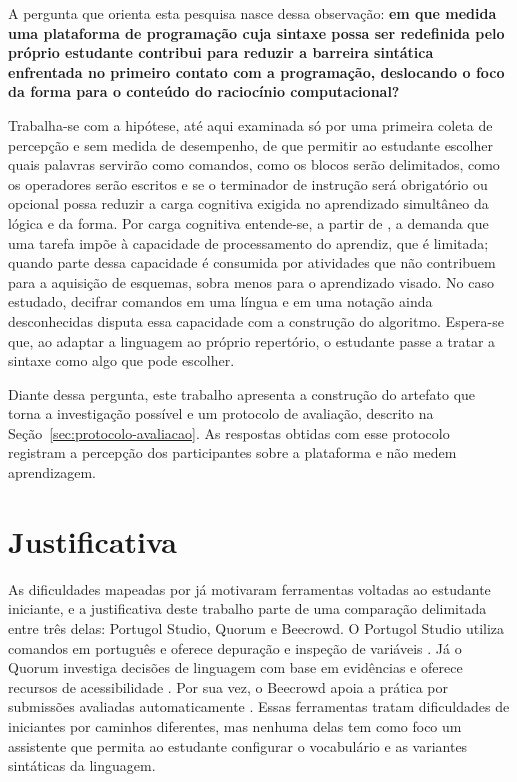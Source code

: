 A pergunta que orienta esta pesquisa nasce dessa observação: \textbf{em que medida uma plataforma de programação cuja sintaxe possa ser redefinida pelo próprio estudante contribui para reduzir a barreira sintática enfrentada no primeiro contato com a programação, deslocando o foco da forma para o conteúdo do raciocínio computacional?}

Trabalha-se com a hipótese, até aqui examinada só por uma primeira coleta de percepção e sem medida de desempenho, de que permitir ao estudante escolher quais palavras servirão como comandos, como os blocos serão delimitados, como os operadores serão escritos e se o terminador de instrução será obrigatório ou opcional possa reduzir a carga cognitiva exigida no aprendizado simultâneo da lógica e da forma. Por carga cognitiva entende-se, a partir de , a demanda que uma tarefa impõe à capacidade de processamento do aprendiz, que é limitada; quando parte dessa capacidade é consumida por atividades que não contribuem para a aquisição de esquemas, sobra menos para o aprendizado visado. No caso estudado, decifrar comandos em uma língua e em uma notação ainda desconhecidas disputa essa capacidade com a construção do algoritmo. Espera-se que, ao adaptar a linguagem ao próprio repertório, o estudante passe a tratar a sintaxe como algo que pode escolher.

Diante dessa pergunta, este trabalho apresenta a construção do artefato que torna a investigação possível e um protocolo de avaliação, descrito na Seção~\ref{sec:protocolo-avaliacao}. As respostas obtidas com esse protocolo registram a percepção dos participantes sobre a plataforma e não medem aprendizagem.

\section{Justificativa}

As dificuldades mapeadas por  já motivaram ferramentas voltadas ao estudante iniciante, e a justificativa deste trabalho parte de uma comparação delimitada entre três delas: Portugol Studio, Quorum e Beecrowd. O Portugol Studio utiliza comandos em português e oferece depuração e inspeção de variáveis \cite{univali2026}. Já o Quorum investiga decisões de linguagem com base em evidências e oferece recursos de acessibilidade \cite{quorum2025}. Por sua vez, o Beecrowd apoia a prática por submissões avaliadas automaticamente \cite{beecrowd2026faq}. Essas ferramentas tratam dificuldades de iniciantes por caminhos diferentes, mas nenhuma delas tem como foco um assistente que permita ao estudante configurar o vocabulário e as variantes sintáticas da linguagem.

